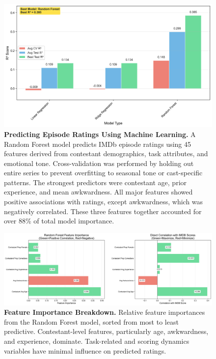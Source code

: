 \documentclass[10pt,letterpaper]{article}
\begin{document}
\begin{figure}[!h]
\centering
\includegraphics[width=\linewidth]{FiguresPNG/Fig10.png}
\caption{{\bf Predicting Episode Ratings Using Machine Learning.}
A Random Forest model predicts IMDb episode ratings using 45 features derived from contestant demographics, task attributes, and emotional tone. Cross-validation was performed by holding out entire series to prevent overfitting to seasonal tone or cast-specific patterns. The strongest predictors were contestant age, prior experience, and mean awkwardness. All major features showed positive associations with ratings, except awkwardness, which was negatively correlated. These three features together accounted for over 88\% of total model importance.}
\label{fig:ml_prediction}
\end{figure}
\FloatBarrier

\begin{figure}[!h]
\centering
\includegraphics[width=\linewidth]{FiguresPNG/Fig11.png}
\caption{{\bf Feature Importance Breakdown.}
Relative feature importances from the Random Forest model, sorted from most to least predictive. Contestant-level features, particularly age, awkwardness, and experience, dominate. Task-related and scoring dynamics variables have minimal influence on predicted ratings.}
\label{fig:feature_importance}
\end{figure}
\FloatBarrier
\end{document}

